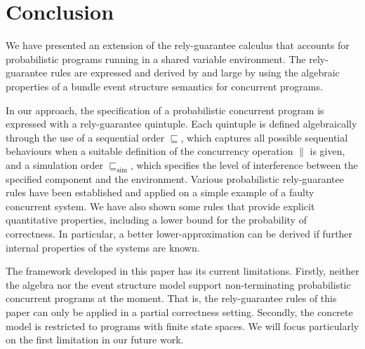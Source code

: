 \documentclass[review]{elsart}
\newcommand{\refby}{\sqsubseteq}
\newcommand{\simref}{\refby_{\mathrm{sim}}}
\begin{document}
\section{Conclusion}

We have presented an extension of the rely-guarantee calculus that accounts for probabilistic programs running in a shared variable environment. The rely-guarantee rules are expressed and derived by and large by using the algebraic properties of a bundle event structure semantics for concurrent programs. 

In our approach, the specification of a probabilistic concurrent program is expressed with a rely-guarantee quintuple. Each quintuple is defined algebraically through the use of a sequential order $\refby$, which captures all possible sequential behaviours when a suitable definition of the concurrency operation $\|$ is given, and a simulation order $\simref$, which specifies the level of interference between the specified component and the environment. Various probabilistic rely-guarantee rules have been established and applied on a simple example of a faulty concurrent system. We have also shown some rules that provide explicit quantitative properties, including a lower bound for the probability of correctness. In particular, a better lower-approximation can be derived if further internal properties of the systems are known.

The framework developed in this paper has its current limitations. Firstly, neither the algebra nor the event structure model support non-terminating probabilistic concurrent programs at the moment. That is, the rely-guarantee rules of this paper can only be applied in a partial correctness setting. Secondly, the concrete model is restricted to programs with finite state spaces. We will focus particularly on the first limitation in our future work.



\end{document}
